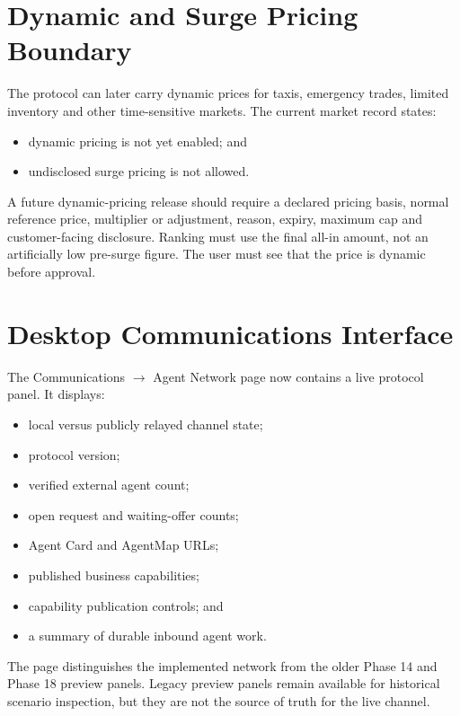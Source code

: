 \documentclass[11pt,a4paper]{article}
\begin{document}
\section{Dynamic and Surge Pricing Boundary}

The protocol can later carry dynamic prices for taxis, emergency trades,
limited inventory and other time-sensitive markets.  The current market record
states:

\begin{itemize}
  \item dynamic pricing is not yet enabled; and
  \item undisclosed surge pricing is not allowed.
\end{itemize}

A future dynamic-pricing release should require a declared pricing basis,
normal reference price, multiplier or adjustment, reason, expiry, maximum cap
and customer-facing disclosure.  Ranking must use the final all-in amount, not
an artificially low pre-surge figure.  The user must see that the price is
dynamic before approval.

\section{Desktop Communications Interface}

The Communications \texorpdfstring{$\rightarrow$}{->} Agent Network page now
contains a live protocol panel.  It displays:

\begin{itemize}
  \item local versus publicly relayed channel state;
  \item protocol version;
  \item verified external agent count;
  \item open request and waiting-offer counts;
  \item Agent Card and AgentMap URLs;
  \item published business capabilities;
  \item capability publication controls; and
  \item a summary of durable inbound agent work.
\end{itemize}

The page distinguishes the implemented network from the older Phase 14 and
Phase 18 preview panels.  Legacy preview panels remain available for historical
scenario inspection, but they are not the source of truth for the live channel.
\end{document}
